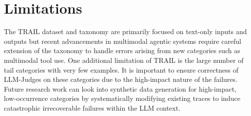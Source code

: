 \section*{Limitations}

The TRAIL dataset and taxonomy are primarily focused on text-only inputs and outputs but recent advancements in multimodal agentic systems require careful extension of the taxonomy to handle errors arising from new categories such as multimodal tool use. One additional limitation of TRAIL is the large number of tail categories with very few examples. It is important to ensure correctness of LLM-Judges on these categories due to the high-impact nature of the failures. Future research work can look into synthetic data generation for high-impact, low-occurrence categories by systematically modifying existing traces to induce catastrophic irrecoverable failures within the LLM context.